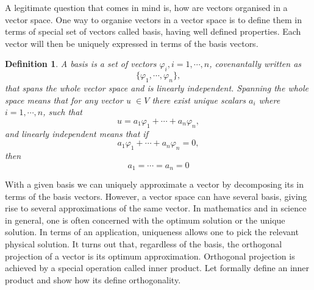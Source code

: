 \documentclass[11pt, oneside]{article}   	%
\newtheorem{definition}{Definition}
\begin{document}
\justify
A legitimate question that comes in mind is, how are vectors organised in a vector space. One way to organise vectors in a vector space is to define them in terms of special set of vectors called basis, having well defined properties. Each vector will then be uniquely expressed in terms of the basis vectors. 
\justify
\begin{definition}
A basis is a set of vectors $\varphi_{i}, i = 1, \cdots, n$, covenantally written as 
\begin{equation}
\{ \varphi_{1}, \cdots, \varphi_{n} \} \nonumber,
\end{equation}
that spans the whole vector space and is linearly independent. Spanning the whole space means that for any vector u $\in V$ there exist unique scalars $a_{i}$ where $i=1,\cdots,n$, such that 
\begin{equation}
u = a_{1}\varphi_{1} + \cdots + a_{n}\varphi_{n} \nonumber,
\end{equation}
and linearly independent means that if
\begin{equation}
a_{1}\varphi_{1} + \cdots + a_{n}\varphi_{n} = 0 \nonumber,
\end{equation}
then 
\begin{equation}
a_{1} = \cdots = a_{n} = 0 \nonumber
\end{equation}
\end{definition}
\justify
With a given basis we can uniquely approximate a vector by decomposing its in terms of the basis vectors. However, a vector space can have several basis, giving rise to several approximations of the same vector. In mathematics and in science in general, one is often concerned with the optimum solution or the unique solution. In terms of an application, uniqueness allows one to pick the relevant physical solution.
It turns out that, regardless of the basis, the orthogonal projection of a vector is its optimum approximation. Orthogonal projection is achieved by a special operation called inner product. Let formally define an inner product and show how its define orthogonality.
\end{document}

